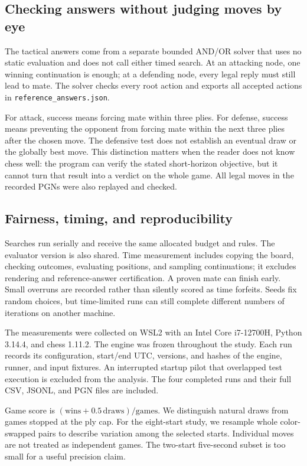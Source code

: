 \documentclass[oneside,final]{hcmut-report}
\begin{document}
\subsection{Checking answers without judging moves by eye}
The tactical answers come from a separate bounded AND/OR solver that uses
no static evaluation and does not call either timed search. At an attacking
node, one winning continuation is enough; at a defending node, every legal
reply must still lead to mate. The solver checks every root action and
exports all accepted actions in \texttt{reference\_answers.json}.

For attack, success means forcing mate within three plies. For defense,
success means preventing the opponent from forcing mate within the next
three plies after the chosen move. The defensive test does not establish
an eventual draw or the globally best move. This distinction matters when
the reader does not know chess well: the program can verify the stated
short-horizon objective, but it cannot turn that result into a verdict on
the whole game. All legal moves in the recorded PGNs were also replayed
and checked.

\subsection{Fairness, timing, and reproducibility}
Searches run serially and receive the same allocated budget and rules.
The evaluator version is also shared. Time measurement includes copying
the board, checking outcomes, evaluating positions, and sampling continuations;
it excludes rendering and reference-answer certification. A proven mate
can finish early. Small overruns are recorded rather than silently scored
as time forfeits. Seeds fix random choices, but time-limited runs can still
complete different numbers of iterations on another machine.

The measurements were collected on WSL2 with an Intel Core i7-12700H,
Python 3.14.4, and chess 1.11.2. The engine was frozen throughout the study.
Each run records its configuration, start/end UTC, versions, and hashes
of the engine, runner, and input fixtures. An interrupted startup pilot
that overlapped test execution is excluded from the analysis. The four
completed runs and their full CSV, JSONL, and PGN files are included.

Game score is $(\text{wins}+0.5\,\text{draws})/\text{games}$. We distinguish
natural draws from games stopped at the ply cap. For the eight-start study,
we resample whole color-swapped pairs to describe variation among the
selected starts. Individual moves are not treated as independent games.
The two-start five-second subset is too small for a useful precision claim.
\end{document}
